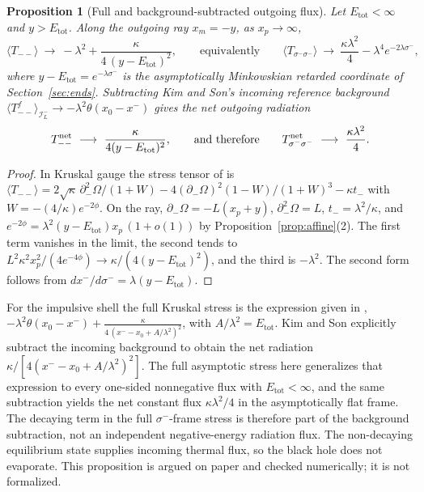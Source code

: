 \documentclass[11pt]{article}
\newtheorem{proposition}{Proposition}
\theoremstyle{remark}
\newcommand{\Etot}{E_{\mathrm{tot}}}
\begin{document}
\begin{proposition}[Full and background-subtracted outgoing flux]\label{prop:radiation}
Let $\Etot<\infty$ and $y>\Etot$. Along the outgoing ray $x_m=-y$, as $x_p\to\infty$,
\[
\langle T_{--}\rangle\ \longrightarrow\ -\lambda^2+\frac{\kappa}{4\,(y-\Etot)^2},
\qquad\text{equivalently}\qquad
\langle T_{\sigma^-\sigma^-}\rangle\ \longrightarrow\ \frac{\kappa\lambda^2}{4}-\lambda^4e^{-2\lambda\sigma^-},
\]
where $y-\Etot=e^{-\lambda\sigma^-}$ is the asymptotically Minkowskian retarded coordinate of Section~\ref{sec:ends}. Subtracting Kim and Son's incoming reference background $\langle T^f_{--}\rangle_{\mathcal I^-_L}\to-\lambda^2\theta(x_0-x^-)$ gives the net outgoing radiation
\[
T^{\rm net}_{--}\ \longrightarrow\ \frac{\kappa}{4(y-\Etot)^2},
\qquad\text{and therefore}\qquad
T^{\rm net}_{\sigma^-\sigma^-}\ \longrightarrow\ \frac{\kappa\lambda^2}{4}.
\]
\end{proposition}
\begin{proof}
In Kruskal gauge the stress tensor of \cite{KimSon} is $\langle T_{--}\rangle=2\sqrt\kappa\,\partial_-^2\Omega/(1+W)-4(\partial_-\Omega)^2(1-W)/(1+W)^3-\kappa t_-$ with $W=-(4/\kappa)e^{-2\phi}$. On the ray, $\partial_-\Omega=-L(x_p+y)$, $\partial_-^2\Omega=L$, $t_-=\lambda^2/\kappa$, and $e^{-2\phi}=\lambda^2(y-\Etot)x_p\,(1+o(1))$ by Proposition~\ref{prop:affine}(2). The first term vanishes in the limit, the second tends to $L^2\kappa^2x_p^2/(4e^{-4\phi})\to\kappa/(4(y-\Etot)^2)$, and the third is $-\lambda^2$. The second form follows from $dx^-/d\sigma^-=\lambda(y-\Etot)$.
\end{proof}

For the impulsive shell the full Kruskal stress is the expression given in \cite{KimSon}, $-\lambda^2\theta(x_0-x^-)+\frac{\kappa}{4\,(x^--x_0+A/\lambda^2)^2}$, with $A/\lambda^2=\Etot$. Kim and Son explicitly subtract the incoming background to obtain the net radiation $\kappa/[4(x^--x_0+A/\lambda^2)^2]$. The full asymptotic stress here generalizes that expression to every one-sided nonnegative flux with $\Etot<\infty$, and the same subtraction yields the net constant flux $\kappa\lambda^2/4$ in the asymptotically flat frame. The decaying term in the full $\sigma^-$-frame stress is therefore part of the background subtraction, not an independent negative-energy radiation flux. The non-decaying equilibrium state supplies incoming thermal flux, so the black hole does not evaporate. This proposition is argued on paper and checked numerically; it is not formalized.
\end{document}
